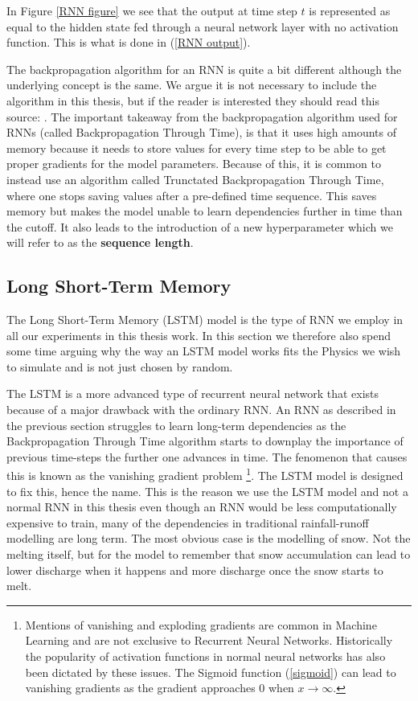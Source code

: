 In Figure \ref{RNN figure} we see that the output at time step $t$ is represented 
as equal to the hidden state fed through a neural network layer with no activation 
function. This is what is done in (\ref{RNN output}).

The backpropagation algorithm for an RNN is quite a bit different although the 
underlying concept is the same. We argue it is not necessary to include the algorithm 
in this thesis, but if the reader is interested they should read this source: \citet{BPTT}.
The important takeaway from the backpropagation algorithm used for RNNs (called 
Backpropagation Through Time), is that it uses high amounts of memory because 
it needs to store values for every time step to be able to get proper gradients 
for the model parameters. Because of this, it is common to instead use an algorithm 
called Trunctated Backpropagation Through Time, where one stops saving values after 
a pre-defined time sequence. This saves memory but makes the model unable to learn 
dependencies further in time than the cutoff. It also leads to the introduction of 
a new hyperparameter which we will refer to as the \textbf{sequence length}. 

\subsection{Long Short-Term Memory}
\label{LSTM Theory}
The Long Short-Term Memory (LSTM) model is the type of RNN we employ in all our 
experiments in this thesis work. In this section we therefore also spend some 
time arguing why the way an LSTM model works fits the Physics we wish to simulate 
and is not just chosen by random. 

The LSTM is a more advanced type of recurrent neural network that exists because 
of a major drawback with the ordinary RNN. An RNN as described in the previous section 
struggles to learn long-term dependencies as the Backpropagation Through Time 
algorithm starts to downplay the importance of previous time-steps the further one 
advances in time. The fenomenon that causes this is known as the vanishing gradient 
problem \citep{bengio1994learning} \citep{graves2012long} \footnote{Mentions of 
vanishing and exploding gradients are common in Machine Learning and are not 
exclusive to Recurrent Neural Networks. Historically the popularity of activation 
functions in normal neural networks has also been dictated by these issues. The 
Sigmoid function (\ref{sigmoid}) can lead to vanishing gradients as the gradient 
approaches $0$ when $x\rightarrow \infty$.}.
The LSTM model is designed to fix this, 
hence the name. This is the reason we use the LSTM model and not a normal RNN in 
this thesis even though an RNN would be less computationally expensive to train, 
many of the dependencies in traditional rainfall-runoff modelling are long term. 
The most obvious case is the modelling of snow. Not the melting itself, but for 
the model to remember that snow accumulation can lead to lower discharge when it 
happens and more discharge once the snow starts to melt.

